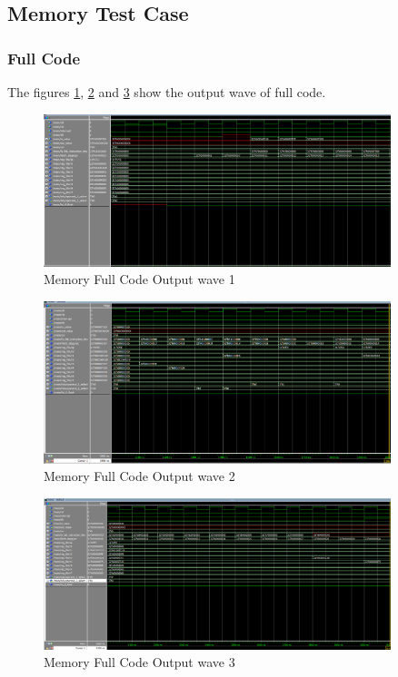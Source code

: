 \subsection{Memory Test Case}

\subsubsection{Full Code}
The figures \ref{fig:mem_reg_1}, \ref{fig:mem_reg_2} and \ref{fig:mem_reg_3} show the output wave of full code.
\begin{figure}[H]
    \centering
    \includegraphics[width=0.9\textwidth]{images/test_cases/memory/Memory_regular_1.PNG}
    \caption{Memory Full Code Output wave 1}
    \label{fig:mem_reg_1}
\end{figure}

\begin{figure}[H]
    \centering
    \includegraphics[width=0.9\textwidth]{images/test_cases/memory/Memory_regular_2.PNG}
    \caption{Memory Full Code Output wave 2}
    \label{fig:mem_reg_2}
\end{figure}

\begin{figure}[H]
    \centering
    \includegraphics[width=0.9\textwidth]{images/test_cases/memory/Memory_regular_3.PNG}
    \caption{Memory Full Code Output wave 3}
    \label{fig:mem_reg_3}
\end{figure}

